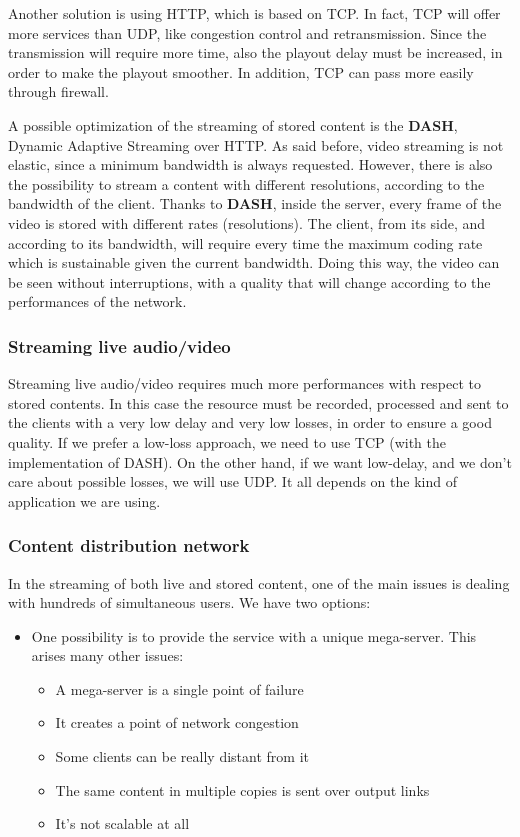 Another solution is using HTTP, which is based on TCP. In fact, TCP will offer more services than UDP, like congestion control and retransmission. Since the transmission will require more time, also the playout delay must be increased, in order to make the playout smoother. In addition, TCP can pass more easily through firewall.

A possible optimization of the streaming of stored content is the \textbf{DASH}, Dynamic Adaptive Streaming over HTTP. As said before, video streaming is not elastic, since a minimum bandwidth is always requested. However, there is also the possibility to stream a content with different resolutions, according to the bandwidth of the client. Thanks to \textbf{DASH}, inside the server, every frame of the video is stored with different rates (resolutions). The client, from its side, and according to its bandwidth, will require every time the maximum coding rate which is sustainable given the current bandwidth. Doing this way, the video can be seen without interruptions, with a quality that will change according to the performances of the network.

\subsubsection{Streaming live audio/video}
Streaming live audio/video requires much more performances with respect to stored contents. In this case the resource must be recorded, processed and sent to the clients with a very low delay and very low losses, in order to ensure a good quality. If we prefer a low-loss approach, we need to use TCP (with the implementation of DASH). On the other hand, if we want low-delay, and we don't care about possible losses, we will use UDP. It all depends on the kind of application we are using.

\subsubsection{Content distribution network}
In the streaming of both live and stored content, one of the main issues is dealing with hundreds of simultaneous users. We have two options:
\begin{itemize}
    \item One possibility is to provide the service with a unique mega-server. This arises many other issues:
    \begin{itemize}
        \item A mega-server is a single point of failure
        \item It creates a point of network congestion
        \item Some clients can be really distant from it
        \item The same content in multiple copies is sent over output links
        \item It's not scalable at all
    \end{itemize}
\end{itemize}


